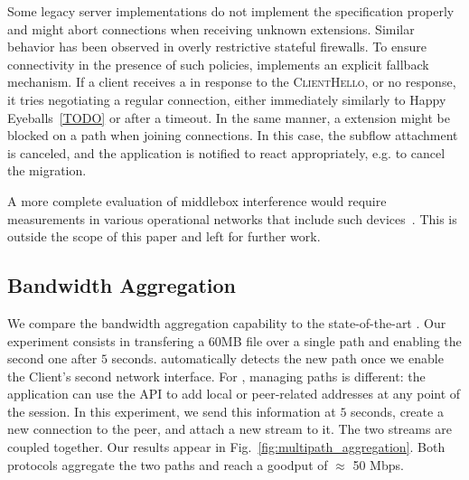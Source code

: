 Some legacy \tls server implementations do not implement the \tls
specification properly and might abort connections when receiving unknown \tls
extensions. Similar behavior has been observed in overly restrictive stateful
firewalls. To ensure connectivity in the presence of such policies, \tcpls
implements an explicit fallback mechanism. If a client receives a \tcp \rst in
response to the \tcpls \textsc{ClientHello}, or no response, it
tries negotiating a regular \tls connection, either
immediately similarly to Happy Eyeballs~\ref{TODO} or after a timeout. 
In the same manner, a \tcpls \join extension might be
blocked on a path when joining connections. In this case, the subflow 
attachment is canceled, and
the application is notified to react appropriately, e.g. to cancel the 
migration.

A more complete evaluation of middlebox interference would require measurements 
in various operational networks that include such 
devices~\cite{honda2011still,raman2020measuring,o2016tls}. This is
outside the scope of this paper and left for further work. 



\subsection{Bandwidth Aggregation}
\label{sec:bwaggr}
We compare the \tcpls bandwidth aggregation capability to the state-of-the-art
\mptcp. 
Our experiment consists in transfering a 60MB file over a single path
and enabling the second one after $5$ seconds. \mptcp automatically detects
the new path once we enable the Client's second network interface. For \tcpls,
managing paths is different: the application can use the API to add local or
peer-related addresses at any point of the session. In this experiment, we send
this information at $5$ seconds, create a new \tcp connection to the peer, and
attach a new stream to it. The two streams are coupled together. Our results 
appear in Fig.~\ref{fig:multipath_aggregation}. Both protocols aggregate the 
two paths and reach a goodput of $\approx$ 50 Mbps. 

